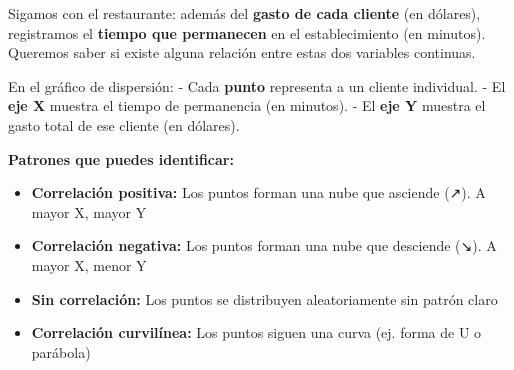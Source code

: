 \documentclass[
  spanish,
  letterpaper,
  DIV=11,
  numbers=noendperiod]{scrreprt}
\providecommand{\tightlist}{%
  \setlength{\itemsep}{0pt}\setlength{\parskip}{0pt}}
\begin{document}
Sigamos con el restaurante: además del \textbf{gasto de cada cliente}
(en dólares), registramos el \textbf{tiempo que permanecen} en el
establecimiento (en minutos). Queremos saber si existe alguna relación
entre estas dos variables continuas.

En el gráfico de dispersión: - Cada \textbf{punto} representa a un
cliente individual. - El \textbf{eje X} muestra el tiempo de permanencia
(en minutos). - El \textbf{eje Y} muestra el gasto total de ese cliente
(en dólares).

\textbf{Patrones que puedes identificar:}

\begin{tcolorbox}[enhanced jigsaw, arc=.35mm, leftrule=.75mm, colbacktitle=quarto-callout-tip-color!10!white, left=2mm, opacitybacktitle=0.6, toptitle=1mm, title=\textcolor{quarto-callout-tip-color}{\faLightbulb}\hspace{0.5em}{Tipos de relaciones en un gráfico de dispersión}, colframe=quarto-callout-tip-color-frame, toprule=.15mm, colback=white, rightrule=.15mm, opacityback=0, coltitle=black, breakable, bottomtitle=1mm, titlerule=0mm, bottomrule=.15mm]

\begin{itemize}
\tightlist
\item
  \textbf{Correlación positiva:} Los puntos forman una nube que asciende
  (↗). A mayor X, mayor Y
\item
  \textbf{Correlación negativa:} Los puntos forman una nube que
  desciende (↘). A mayor X, menor Y\\
\item
  \textbf{Sin correlación:} Los puntos se distribuyen aleatoriamente sin
  patrón claro
\item
  \textbf{Correlación curvilínea:} Los puntos siguen una curva (ej.
  forma de U o parábola)
\end{itemize}

\end{tcolorbox}
\end{document}
